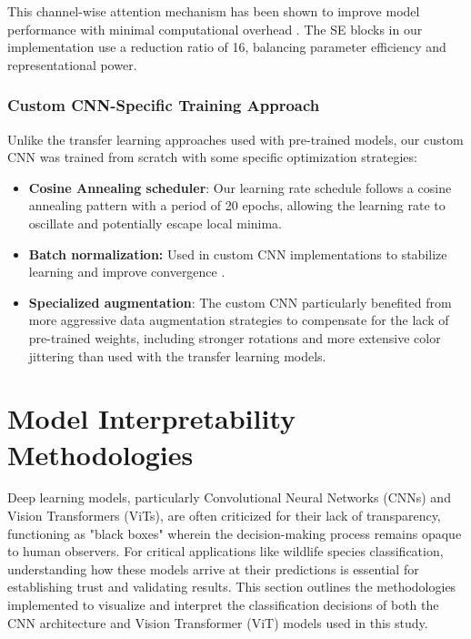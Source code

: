\documentclass[a4paper,12pt]{report}
\begin{document}
This channel-wise attention mechanism has been shown to improve model performance with minimal computational overhead \citep{Hu_2018_CVPR}. The SE blocks in our implementation use a reduction ratio of 16, balancing parameter efficiency and representational power.

\subsubsection{Custom CNN-Specific Training Approach}

Unlike the transfer learning approaches used with pre-trained models, our custom CNN was trained from scratch with some specific optimization strategies:

\begin{itemize}
    \item \textbf{Cosine Annealing scheduler}: Our learning rate schedule follows a cosine annealing pattern with a period of 20 epochs, allowing the learning rate to oscillate and potentially escape local minima.
    
    \item \textbf{Batch normalization:} Used in custom CNN implementations to stabilize learning and improve convergence \citep{ioffe2015batch}.
    
    \item \textbf{Specialized augmentation}: The custom CNN particularly benefited from more aggressive data augmentation strategies to compensate for the lack of pre-trained weights, including stronger rotations and more extensive color jittering than used with the transfer learning models.
\end{itemize}

\section{Model Interpretability Methodologies}

Deep learning models, particularly Convolutional Neural Networks (CNNs) and Vision Transformers (ViTs), are often criticized for their lack of transparency, functioning as "black boxes" wherein the decision-making process remains opaque to human observers. For critical applications like wildlife species classification, understanding how these models arrive at their predictions is essential for establishing trust and validating results. This section outlines the methodologies implemented to visualize and interpret the classification decisions of both the CNN architecture and Vision Transformer (ViT) models used in this study.
\end{document}
